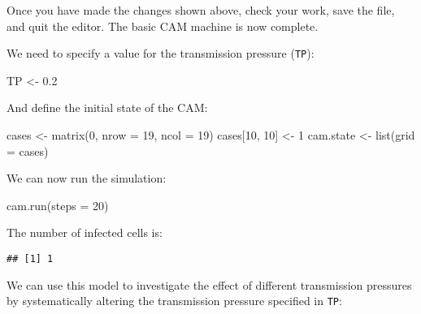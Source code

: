\documentclass[
  12pt,
  a4paper]{book}
\newenvironment{Shaded}{\begin{snugshade}}{\end{snugshade}}
\newcommand{\AttributeTok}[1]{\textcolor[rgb]{0.77,0.63,0.00}{#1}}
\newcommand{\DecValTok}[1]{\textcolor[rgb]{0.00,0.00,0.81}{#1}}
\newcommand{\FloatTok}[1]{\textcolor[rgb]{0.00,0.00,0.81}{#1}}
\newcommand{\FunctionTok}[1]{\textcolor[rgb]{0.00,0.00,0.00}{#1}}
\newcommand{\NormalTok}[1]{#1}
\newcommand{\OtherTok}[1]{\textcolor[rgb]{0.56,0.35,0.01}{#1}}
\newcommand{\SpecialCharTok}[1]{\textcolor[rgb]{0.00,0.00,0.00}{#1}}
\begin{document}
Once you have made the changes shown above, check your work, save the file, and quit the editor. The basic CAM machine is now complete.

We need to specify a value for the transmission pressure (\texttt{TP}):

\begin{Shaded}
\begin{Highlighting}[]
\NormalTok{TP }\OtherTok{\textless{}{-}} \FloatTok{0.2}
\end{Highlighting}
\end{Shaded}

And define the initial state of the CAM:

\begin{Shaded}
\begin{Highlighting}[]
\NormalTok{cases }\OtherTok{\textless{}{-}} \FunctionTok{matrix}\NormalTok{(}\DecValTok{0}\NormalTok{, }\AttributeTok{nrow =} \DecValTok{19}\NormalTok{, }\AttributeTok{ncol =} \DecValTok{19}\NormalTok{)}
\NormalTok{cases[}\DecValTok{10}\NormalTok{, }\DecValTok{10}\NormalTok{] }\OtherTok{\textless{}{-}} \DecValTok{1}
\NormalTok{cam.state }\OtherTok{\textless{}{-}} \FunctionTok{list}\NormalTok{(}\AttributeTok{grid =}\NormalTok{ cases)}
\end{Highlighting}
\end{Shaded}

We can now run the simulation:

\begin{Shaded}
\begin{Highlighting}[]
\FunctionTok{cam.run}\NormalTok{(}\AttributeTok{steps =} \DecValTok{20}\NormalTok{)}
\end{Highlighting}
\end{Shaded}

The number of infected cells is:

\begin{Shaded}
\end{Shaded}

\begin{verbatim}
## [1] 1
\end{verbatim}

We can use this model to investigate the effect of different transmission pressures by systematically altering the transmission pressure specified in \texttt{TP}:
\end{document}
